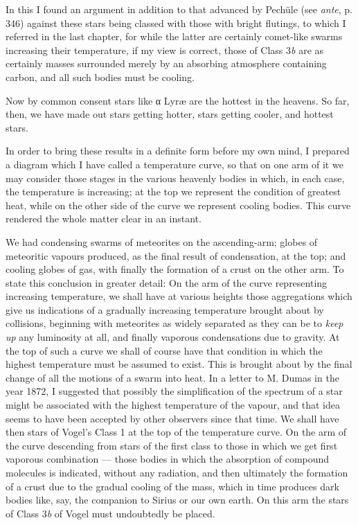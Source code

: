 \documentclass[a4paper, 12pt, oneside, polutonikogreek, english]{article}
\begin{document}
In this I found an argument in addition to that advanced by Pechüle (see \emph{ante}, p. 346) against these stars being classed with those with bright flutings, to which I referred in the last chapter, for while the latter are certainly comet-like swarms increasing their temperature, if my view is correct, those of Class 3\emph{b} are as certainly masses surrounded merely by an absorbing atmosphere containing carbon, and all such bodies must be cooling.

Now by common consent stars like α Lyræ are the hottest in the heavens. So far, then, we have made out stars getting hotter, stars getting cooler, and hottest stars.

In order to bring these results in a definite form before my own mind, I prepared a diagram which I have called a temperature curve, so that on one arm of it we may consider those stages in the various heavenly bodies in which, in each case, the temperature is increasing; at the top we represent the condition of greatest heat, while on the other side of the curve we represent cooling bodies. This curve rendered the whole matter clear in an instant.

We had condensing swarms of meteorites on the ascending-arm; globes of meteoritic vapours produced, as the final result of condensation, at the top; and cooling globes of gas, with finally the formation of a crust on the other arm. To state this conclusion in greater detail: On the arm of the curve representing increasing temperature, we shall have at various heights those aggregations which give us indications of a gradually increasing temperature brought about by collisions, beginning with meteorites as widely separated as they can be to \emph{keep up} any luminosity at all, and finally vaporous condensations due to gravity. At the top of such a curve we shall of course have that condition in which the highest temperature must be assumed to exist. This is brought about by the final change of all the motions of a swarm into heat. In a letter to M. Dumas in the year 1872, I suggested that possibly the simplification of the spectrum of a star might be associated with the highest temperature of the vapour, and that idea seems to have been accepted by other observers since that time. We shall have then stars of Vogel's Class 1 at the top of the temperature curve. On the arm of the curve descending from stars of the first class to those in which we get first vaporous combination --- those bodies in which the absorption of compound molecules is indicated, without any radiation, and then ultimately the formation of a crust due to the gradual cooling of the mass, which in time produces dark bodies like, say, the companion to Sirius or our own earth. On this arm the stars of Class 3\emph{b} of Vogel must undoubtedly be placed.
\end{document}
